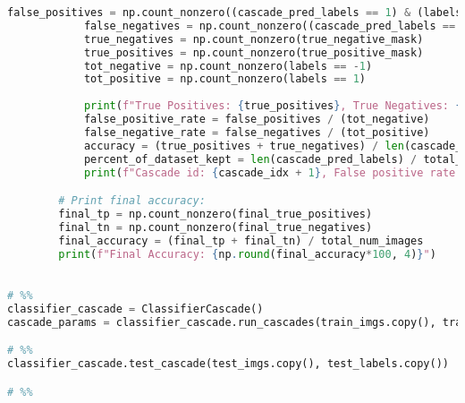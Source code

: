 \documentclass{article}
\begin{document}
\begin{lstlisting}[language=Python]
            false_positives = np.count_nonzero((cascade_pred_labels == 1) & (labels == -1))
            false_negatives = np.count_nonzero((cascade_pred_labels == -1) & (labels == 1))
            true_negatives = np.count_nonzero(true_negative_mask)
            true_positives = np.count_nonzero(true_positive_mask)
            tot_negative = np.count_nonzero(labels == -1)
            tot_positive = np.count_nonzero(labels == 1)
            
            print(f"True Positives: {true_positives}, True Negatives: {true_negatives}, Total Image Count {total_num_images}")
            false_positive_rate = false_positives / (tot_negative)
            false_negative_rate = false_negatives / (tot_positive)
            accuracy = (true_positives + true_negatives) / len(cascade_pred_labels)
            percent_of_dataset_kept = len(cascade_pred_labels) / total_num_images
            print(f"Cascade id: {cascade_idx + 1}, False positive rate: {false_positive_rate:.2f}, False negative rate: {false_negative_rate:.2f}, Accuracy: {np.round(accuracy*100, 4)}, over {np.round(percent_of_dataset_kept*100, 4)} of the imgs.")

        # Print final accuracy:
        final_tp = np.count_nonzero(final_true_positives)
        final_tn = np.count_nonzero(final_true_negatives)
        final_accuracy = (final_tp + final_tn) / total_num_images
        print(f"Final Accuracy: {np.round(final_accuracy*100, 4)}")
        

# %%
classifier_cascade = ClassifierCascade()
cascade_params = classifier_cascade.run_cascades(train_imgs.copy(), train_labels.copy())

# %%
classifier_cascade.test_cascade(test_imgs.copy(), test_labels.copy())

# %%


\end{lstlisting}
\end{document}
